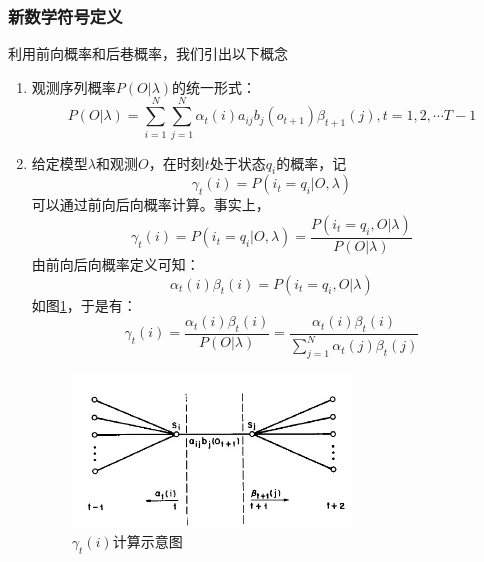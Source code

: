         \subsubsection{新数学符号定义}
        利用前向概率和后巷概率，我们引出以下概念
        \begin{enumerate}
            \item 观测序列概率$P(O|\lambda )$的统一形式：
                \begin{equation}
                    P(O|\lambda ) = \sum\limits_{i = 1}^N {\sum\limits_{j = 1}^N {{\alpha _t}(i)} {a_{ij}}{b_j}({o_{t + 1}}){\beta _{t + 1}}\left( j \right),} t = 1,2, \cdots T - 1
                \end{equation}
            \item 给定模型$\lambda $和观测$O$，在时刻$t$处于状态$q_i$的概率，记
                \begin{equation}
                    {\gamma _t}(i) = P({i_t} = {q_i}|O,\lambda )
                \end{equation}
                可以通过前向后向概率计算。事实上，
                \[{\gamma _t}(i) = P({i_t} = {q_i}|O,\lambda ) = \frac{{P({i_t} = {q_i},O|\lambda )}}{{P(O|\lambda )}}\]
                由前向后向概率定义可知：
                \[{\alpha _t}(i){\beta _t}(i) = P({i_t} = {q_i},O|\lambda )\]
                如图\ref{fig:gamma}，于是有：
                \begin{equation}\label{equation:gamma}
                {\gamma _t}(i) = \frac{{{\alpha _t}(i){\beta _t}(i)}}{{P(O|\lambda )}} = \frac{{{\alpha _t}(i){\beta _t}(i)}}{{\sum\limits_{j = 1}^N {{\alpha _t}(j){\beta _t}(j)} }}
                \end{equation}

                \begin{figure}
                \centering
                \includegraphics[width=0.7\textwidth]{figures/chapter2/gamma}
                \caption{${\gamma _t}(i)$计算示意图}
                \label{fig:gamma}
                \end{figure}


\end{enumerate}
